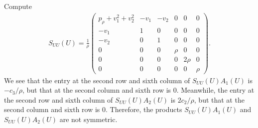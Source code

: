\documentclass{article}
\theoremstyle{plain}
\begin{document}
Compute
\begin{eqnarray*}
  S_{UU}(U) =\frac{1}{\rho} \left( \begin{array}{cccccc} p_\rho + v_1^2+v_2^2 & -v_1 & -v_2 &0 &0 &0 \\
    -v_1 & 1 & 0  & 0 & 0 & 0  \\
    -v_2 & 0 & 1 & 0 & 0 & 0  \\
    0 & 0 & 0 & \rho & 0 & 0 \\
    0 & 0 & 0 & 0 & 2\rho & 0 \\
    0 & 0 & 0 & 0 & 0 & \rho \end{array} \right).
\end{eqnarray*}
We see that the entry at the second row and sixth column of $S_{UU}(U)A_1(U)$ is $-c_3/\rho$, but that at the second column and sixth row is 0.
Meanwhile, the entry at the second row and sixth column of $S_{UU}(U) A_2(U)$ is $2c_2/\rho$, but that at the second column and sixth row is 0.
Therefore, the products $S_{UU}(U)A_1(U)$ and $S_{UU}(U)A_2(U)$ are not symmetric.
\end{document}
